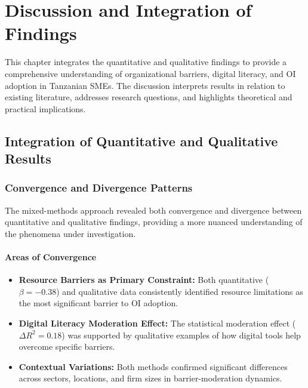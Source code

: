 \chapter{Discussion and Integration of Findings}

This chapter integrates the quantitative and qualitative findings to provide a comprehensive understanding of organizational barriers, digital literacy, and OI adoption in Tanzanian SMEs. The discussion interprets results in relation to existing literature, addresses research questions, and highlights theoretical and practical implications.

\section{Integration of Quantitative and Qualitative Results}

\subsection{Convergence and Divergence Patterns}

The mixed-methods approach revealed both convergence and divergence between quantitative and qualitative findings, providing a more nuanced understanding of the phenomena under investigation.

\subsubsection{Areas of Convergence}
\begin{itemize}
    \item \textbf{Resource Barriers as Primary Constraint:} Both quantitative ($\beta = -0.38$) and qualitative data consistently identified resource limitations as the most significant barrier to OI adoption.

    \item \textbf{Digital Literacy Moderation Effect:} The statistical moderation effect ($\Delta R^2 = 0.18$) was supported by qualitative examples of how digital tools help overcome specific barriers.

    \item \textbf{Contextual Variations:} Both methods confirmed significant differences across sectors, locations, and firm sizes in barrier-moderation dynamics.
\end{itemize}

